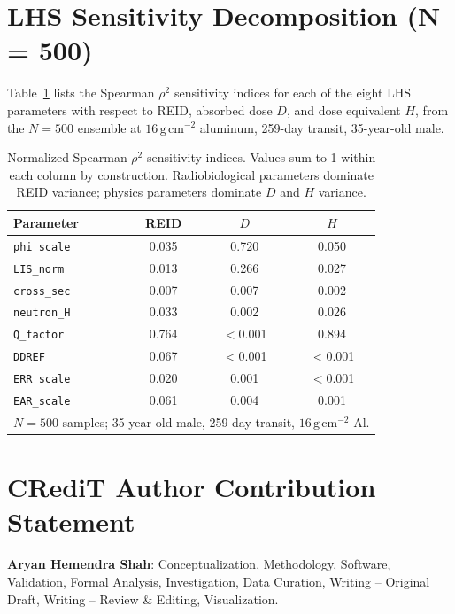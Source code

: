 \documentclass[12pt,letterpaper]{article}
\newcommand{\gcm}{\,\mathrm{g\,cm^{-2}}}
\newcommand{\code}[1]{\texttt{#1}}
\begin{document}
\appendix

\section{LHS Sensitivity Decomposition (N = 500)}
\label{app:sensitivity}

Table~\ref{tab:sensitivity} lists the Spearman $\rho^2$ sensitivity indices
for each of the eight LHS parameters with respect to REID, absorbed dose $D$,
and dose equivalent $H$, from the $N = 500$ ensemble at $16\gcm$ aluminum,
259-day transit, 35-year-old male.

\begin{table}[H]
  \centering
  \caption{Normalized Spearman $\rho^2$ sensitivity indices.
           Values sum to 1 within each column by construction.
           Radiobiological parameters dominate REID variance;
           physics parameters dominate $D$ and $H$ variance.}
  \label{tab:sensitivity}
  \begin{tabular}{lccc}
    \toprule
    Parameter & REID & $D$ & $H$ \\
    \midrule
    \code{phi\_scale}   & 0.035 & 0.720 & 0.050 \\
    \code{LIS\_norm}    & 0.013 & 0.266 & 0.027 \\
    \code{cross\_sec}   & 0.007 & 0.007 & 0.002 \\
    \code{neutron\_H}   & 0.033 & 0.002 & 0.026 \\
    \code{Q\_factor}    & 0.764 & $<$0.001 & 0.894 \\
    \code{DDREF}        & 0.067 & $<$0.001 & $<$0.001 \\
    \code{ERR\_scale}   & 0.020 & 0.001 & $<$0.001 \\
    \code{EAR\_scale}   & 0.061 & 0.004 & 0.001 \\
    \bottomrule
    \multicolumn{4}{l}{\small $N = 500$ samples; 35-year-old male, 259-day transit, $16\gcm$ Al.} \\
  \end{tabular}
\end{table}

\section*{CRediT Author Contribution Statement}

\textbf{Aryan Hemendra Shah}: Conceptualization, Methodology, Software,
Validation, Formal Analysis, Investigation, Data Curation,
Writing -- Original Draft, Writing -- Review \& Editing, Visualization.
\end{document}
